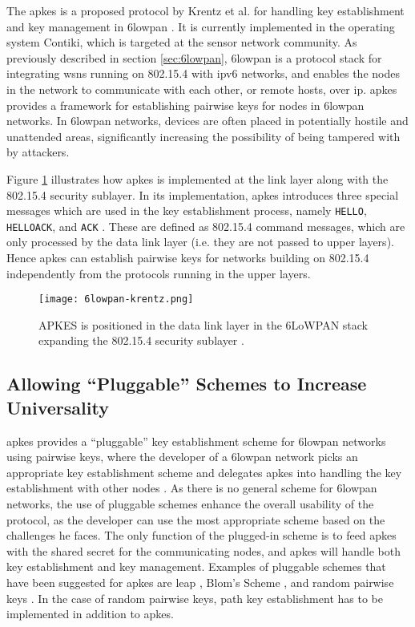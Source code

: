 The \gls{apkes} is a proposed protocol by Krentz et al. for handling key establishment and key management in \gls{6lowpan} \cite{krentz20136lowpan}. It is currently implemented in the operating system Contiki, which is targeted at the sensor network community. As previously described in section \ref{sec:6lowpan}, \gls{6lowpan} is a protocol stack for integrating \gls{wsn}s running on 802.15.4 with \gls{ip}v6 networks, and enables the nodes in the network to communicate with each other, or remote hosts, over \gls{ip}. \gls{apkes} provides a framework for establishing pairwise keys for nodes in \gls{6lowpan} networks. In \gls{6lowpan} networks, devices are often placed in potentially hostile and unattended areas, significantly increasing the possibility of being tampered with by attackers.


Figure \ref{fig:6lowpan-krentz} illustrates how \gls{apkes} is implemented at the link layer along with the 802.15.4 security sublayer. In its implementation, \gls{apkes} introduces three special messages which are used in the key establishment process, namely \texttt{HELLO}, \texttt{HELLOACK}, and \texttt{ACK} \cite{krentz20136lowpan}. These are defined as 802.15.4 command messages, which are only processed by the data link layer (i.e. they are not passed to upper layers). Hence \gls{apkes} can establish pairwise keys for networks building on 802.15.4 independently from the protocols running in the upper layers.

\begin{figure}
	\centering
	\texttt{[image: 6lowpan-krentz.png]}
	\caption{APKES is positioned in the data link layer in the 6LoWPAN stack expanding the 802.15.4 security sublayer \cite{krentz20136lowpan}.}
	\label{fig:6lowpan-krentz}
\end{figure}


\subsection{Allowing ``Pluggable'' Schemes to Increase Universality} 

\gls{apkes} provides a ``pluggable'' key establishment scheme for \gls{6lowpan} networks using pairwise keys, where the developer of a \gls{6lowpan} network picks an appropriate key establishment scheme and delegates \gls{apkes} into handling the key establishment with other nodes \cite{krentz20136lowpan}. As there is no general scheme for \gls{6lowpan} networks, the use of pluggable schemes enhance the overall usability of the protocol, as the developer can use the most appropriate scheme based on the challenges he faces. The only function of the plugged-in scheme is to feed \gls{apkes} with the shared secret for the communicating nodes, and \gls{apkes} will handle both key establishment and key management. Examples of pluggable schemes that have been suggested for \gls{apkes} are \gls{leap} \cite{zhu2006leap+}, Blom's Scheme \cite{blom1984optimal}, and random pairwise keys \cite{chan2003random}. In the case of random pairwise keys, path key establishment has to be implemented in addition to \gls{apkes}.

